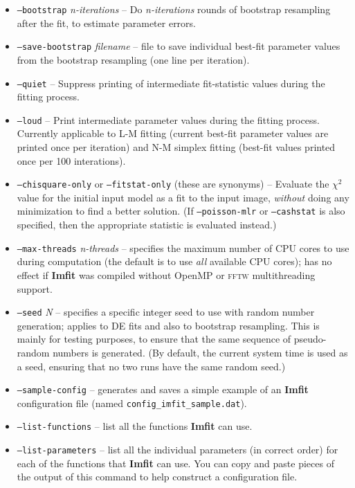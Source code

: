 \documentclass[10pt,a4paper,article]{memoir}
\newcommand{\imfit}{\textbf{Imfit}}
\newcommand{\chisquare}{\ensuremath{\chi^{2}}}
\begin{document}
\begin{itemize}
\bigskip

\item \texttt{--bootstrap} \textit{n-iterations} -- Do \textit{n-iterations} rounds
of bootstrap resampling after the fit, to estimate parameter errors.

\item \texttt{--save-bootstrap} \textit{filename} -- file to save
individual best-fit parameter values from the bootstrap resampling (one
line per iteration).

\bigskip

\item \texttt{--quiet} -- Suppress printing of intermediate fit-statistic values
during the fitting process.

\item \texttt{--loud} -- Print intermediate parameter values during the fitting
process. Currently applicable to L-M fitting (current best-fit parameter values are
printed once per iteration) and N-M simplex fitting (best-fit values printed once per 100 interations).

\bigskip

\item \texttt{--chisquare-only} or \texttt{--fitstat-only} (these are
synonyms) -- Evaluate the \chisquare{} value for the initial input model
as a fit to the input image, \textit{without} doing any minimization to
find a better solution. (If \texttt{--poisson-mlr} or
\texttt{--cashstat} is also specified, then the appropriate statistic is
evaluated instead.)

\bigskip

\item \texttt{--max-threads} \textit{n-threads} -- specifies the maximum number of CPU cores to use
during computation (the default is to use \textit{all} available CPU cores); has no
effect if \imfit{} was compiled without OpenMP or \textsc{fftw} multithreading support.

\item \texttt{--seed} \textit{N} -- specifies a specific integer seed to use with
random number generation; applies to DE fits and also to bootstrap resampling. This is
mainly for testing purposes, to ensure that the same sequence of pseudo-random
numbers is generated. (By default, the current system time is used as a seed,
ensuring that no two runs have the same random seed.)

\bigskip

\item \texttt{--sample-config} -- generates and saves a simple example
of an \imfit{} configuration file (named
\texttt{config\_imfit\_sample.dat}).

\item \texttt{--list-functions} -- list all the functions \imfit{} can use.

\item \texttt{--list-parameters} -- list all the individual parameters (in correct order)
for each of the functions that \imfit{} can use. You can copy and paste pieces of the output
of this command to help construct a configuration file.
\end{itemize}
\end{document}
